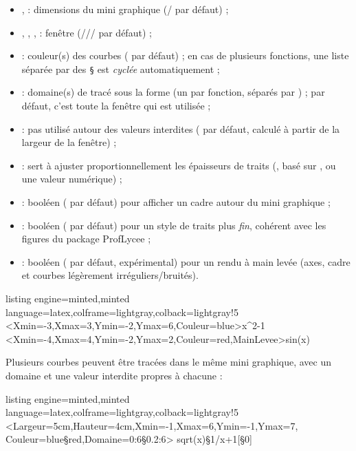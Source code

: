 \documentclass[11pt,a4paper]{ltxdoc}
\begin{document}
\begin{itemize}
  \item {},  : dimensions du mini graphique (\MontreCode{4cm}/\MontreCode{3cm} par défaut) ;
  \item {}, , ,  : fenêtre (/// par défaut) ;
  \item {} : couleur(s) des courbes ( par défaut) ; en cas de plusieurs fonctions, une liste séparée par des \texttt{§} est \textit{cyclée} automatiquement ;
  \item {} : domaine(s) de tracé sous la forme  (un par fonction, séparés par ) ; par défaut, c'est toute la fenêtre  qui est utilisée ;
  \item {} : pas utilisé autour des valeurs interdites ( par défaut, calculé à partir de la largeur de la fenêtre) ;
  \item {} : sert à ajuster proportionnellement les épaisseurs de traits (, basé sur , ou une valeur numérique) ;
  \item {} : booléen ( par défaut) pour afficher un cadre autour du mini graphique ;
  \item {} : booléen ( par défaut) pour un style de traits plus \textit{fin}, cohérent avec les figures du package \textsf{ProfLycee} ;
  \item {} : booléen ( par défaut, expérimental) pour un rendu \og à main levée \fg{} (axes, cadre et courbes légèrement irréguliers/bruités).
\end{itemize}

\begin{tcblisting}{listing engine=minted,minted language=latex,colframe=lightgray,colback=lightgray!5}
\MiniGraphiqueTkz<Xmin=-3,Xmax=3,Ymin=-2,Ymax=6,Couleur=blue>{x^2-1}
\qquad
\MiniGraphiqueTkz<Xmin=-4,Xmax=4,Ymin=-2,Ymax=2,Couleur=red,MainLevee>{sin(x)}
\end{tcblisting}

Plusieurs courbes peuvent être tracées dans le même mini graphique, avec un domaine et une valeur interdite propres à chacune :

\begin{tcblisting}{listing engine=minted,minted language=latex,colframe=lightgray,colback=lightgray!5}
\MiniGraphiqueTkz%
  <Largeur=5cm,Hauteur=4cm,Xmin=-1,Xmax=6,Ymin=-1,Ymax=7,%
  Couleur={blue§red},Domaine={0:6§0.2:6}>%
  {sqrt(x)§1/x+1}[{}§0]
\end{tcblisting}
\end{document}

